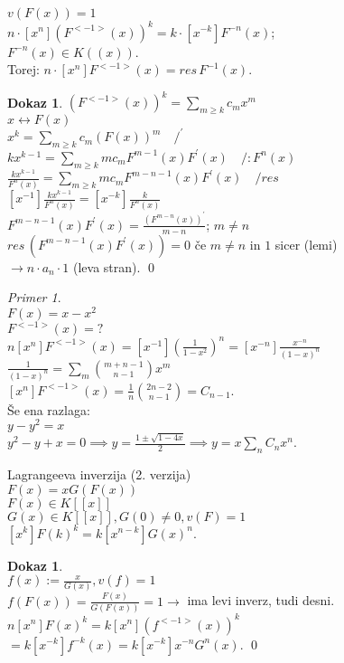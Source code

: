\documentclass[a4paper, 12pt]{book}
\theoremstyle{definition}
\newtheorem{pro}[counter]{Dokaz}
\theoremstyle{remark}
\newtheorem*{ex}{Primer}
\begin{document}
$v(F(x)) = 1$ \\
$n \cdot [x^n] \left(F^{<-1>}(x)\right)^k = k \cdot [x^{-k}] F^{-n}(x)$; \\
$F^{-n}(x) \in K((x))$. \\
Torej: $n \cdot [x^n] F^{<-1>}(x) = res \, F^{-1}(x)$.
\begin{pro}
  $\left(F^{<-1>}(x)\right)^k = \sum_{m \geq k} c_m x^m$ \\
  $x \leftrightarrow F(x)$ \\
  $x^k = \sum_{m \geq k} c_m (F(x))^m \quad /^{'}$ \\
  $k x^{k-1} = \sum_{m \geq k} m c_m F^{m-1}(x) F^{'}(x) \quad /: F^n(x)$ \\
  $\frac{k x^{k-1}}{F^n(x)} = \sum_{m \geq k} m c_m F^{m-n-1}(x) F^{'}(x) \quad / res$ \\
  $[x^{-1}] \frac{k x^{k-1}}{F^n(x)} = [x^{-k}] \frac{k}{F^n(x)}$ \\
  $F^{m-n-1}(x) F^{'}(x) = \frac{\left(F^{m-n}(x)\right)^{'}}{m-n}$; $m \neq n$ \\
  $res \, \left(F^{m-n-1}(x) F^{'}(x)\right) = 0$ če $m \neq n$ in $1$ sicer (lemi) \\
  $\to n \cdot a_n \cdot 1$ (leva stran).
  \qed
\end{pro}
\begin{ex} \text{} \\
  $F(x) = x - x^2$ \\
  $F^{<-1>}(x) = ?$ \\
  $n [x^n] F^{<-1>}(x) = [x^{-1}] \left(\frac{1}{1-x^2}\right)^n = [x^{-n}] \frac{x^{-n}}{(1-x)^n}$ \\
  $\frac{1}{(1-x)^n} = \sum_m \binom{m+n-1}{n-1} x^m$ \\
  $[x^n] F^{<-1>}(x) = \frac{1}{n} \binom{2n-2}{n-1} = C_{n-1}$. \\
  Še ena razlaga: \\
  $y - y^2 = x$ \\
  $y^2 - y + x = 0 \implies y = \frac{1 \pm \sqrt{1-4x}}{2} \implies y = x \sum_n C_n x^n$.
\end{ex}
Lagrangeeva inverzija (2. verzija) \\
$F(x) = x G(F(x))$ \\
$F(x) \in K[[x]]$ \\
$G(x) \in K[[x]], G(0) \neq 0, v(F) = 1$ \\
$[x^k] F(k)^k = k [x^{n-k}] G(x)^n$.
\begin{pro} \text{} \\
  $f(x) := \frac{x}{G(x)}, v(f) = 1$ \\
  $f(F(x)) = \frac{F(x)}{G(F(x))} = 1 \to$ ima levi inverz, tudi desni. \\
  $n [x^n] F(x)^k = k [x^n] \left(f^{<-1>}(x)\right)^k$ \\
  $= k [x^{-k}] f^{-k}(x) = k [x^{-k}] x^{-n} G^n(x)$.
  \qed
\end{pro}
\end{document}
